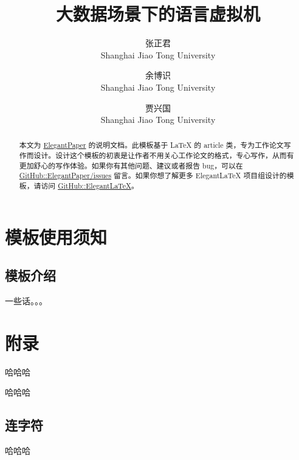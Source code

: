 \documentclass[lang=cn,11pt,a4paper,cite=authoryear]{elegantpaper}
\title{大数据场景下的语言虚拟机}
\author{张正君 \\ Shanghai Jiao Tong University \and 余博识 \\ Shanghai Jiao Tong University \and 贾兴国 \\ Shanghai Jiao Tong University }
\institute{\href{http://www.se.sjtu.edu.cn/}{School of Software Engineering}}
\date{\zhtoday}
\begin{document}
\maketitle

\begin{abstract}
本文为 \href{https://github.com/ElegantLaTeX/ElegantPaper/}{ElegantPaper} 的说明文档。此模板基于 \LaTeX{} 的 article 类，专为工作论文写作而设计。设计这个模板的初衷是让作者不用关心工作论文的格式，专心写作，从而有更加舒心的写作体验。如果你有其他问题、建议或者报告 bug，可以在 \href{https://github.com/ElegantLaTeX/ElegantPaper/issues}{GitHub::ElegantPaper/issues} 留言。如果你想了解更多 Elegant\LaTeX{} 项目组设计的模板，请访问 \href{https://github.com/ElegantLaTeX/}{GitHub::ElegantLaTeX}。
\end{abstract}

\cleardoublepage
\tableofcontents
\cleardoublepage

\section{模板使用须知}

\subsection{模板介绍}


一些话。。。

\nocite{*}


\appendix
\addappheadtotoc
\section{附录}
哈哈哈

哈哈哈
\subsection{连字符}

哈哈哈
\end{document}
